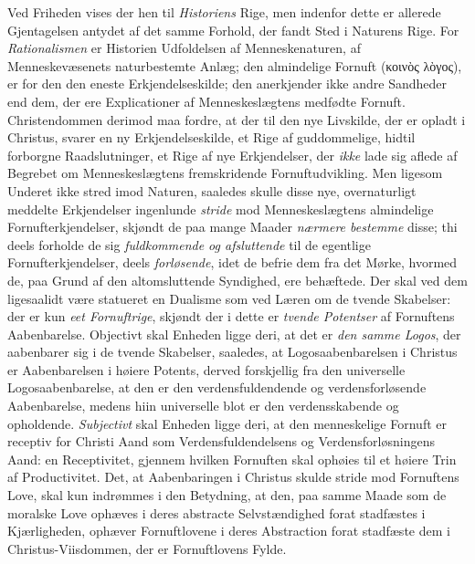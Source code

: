 \documentclass[12pt,a4paper]{book}
\newcommand{\opage}[1]{\marginnote{\footnotesize\textit{[#1]}}}
\begin{document}
Ved Friheden vises der hen til \emph{Historiens} Rige, men indenfor dette er allerede
Gjentagelsen antydet af det samme Forhold, der fandt Sted i Naturens Rige. For \emph{Rationalismen} er Historien Udfoldelsen af Menneskenaturen, af Menneskevæsenets
naturbestemte Anlæg; den almindelige Fornuft (κοινὸς λὸγος), er for den den eneste
Erkjendelseskilde; den anerkjender ikke andre Sandheder end dem, der ere Explicationer af
Menneskeslægtens medfødte Fornuft. Christendommen derimod maa fordre, at der til den nye
Livskilde, der er opladt i Christus, svarer en ny Erkjendelseskilde, et Rige af
guddommelige, hidtil forborgne Raadslutninger, et Rige af nye Erkjendelser, der \emph{ikke} lade sig aflede af Begrebet om Menneskeslægtens fremskridende Fornuftudvikling. Men ligesom
Underet ikke stred imod Naturen, saaledes skulle disse nye, overnaturligt meddelte
Erkjendelser ingenlunde \emph{stride} mod Menneskeslægtens almindelige Fornufterkjendelser,
skjøndt de paa mange Maader \emph{nærmere bestemme} disse; thi deels forholde de sig
\emph{fuldkommende og afsluttende} til de egentlige Fornufterkjendelser, deels
\emph{forløsende}, idet de befrie dem fra det Mørke, hvormed de, paa Grund af den
altomsluttende Syndighed, ere behæftede. Der skal ved dem ligesaalidt være statueret en
Dualisme som ved Læren om de tvende Skabelser: der er kun \emph{eet Fornuftrige}, skjøndt der i dette er \emph{tvende Potentser} af Fornuftens Aabenbarelse. Objectivt skal Enheden ligge
deri, at det er \emph{den samme Logos}, der aabenbarer sig i de tvende Skabelser,
saaledes, at Logosaabenbarelsen i Christus er Aabenbarelsen i høiere Potents, derved
forskjellig fra den universelle Logosaabenbarelse, at den er den verdensfuldendende og
verdensforløsende \opage{91}Aabenbarelse, medens hiin universelle blot er den verdensskabende og
opholdende. \emph{Subjectivt} skal Enheden ligge deri, at den menneskelige Fornuft er receptiv
for Christi Aand som Verdensfuldendelsens og Verdensforløsningens Aand: en Receptivitet,
gjennem hvilken Fornuften skal ophøies til et høiere Trin af Productivitet. Det, at
Aabenbaringen i Christus skulde stride mod Fornuftens Love, skal kun indrømmes i den
Betydning, at den, paa samme Maade som de moralske Love ophæves i deres abstracte
Selvstændighed forat stadfæstes i Kjærligheden, ophæver Fornuftlovene i deres Abstraction
forat stadfæste dem i Christus-Viisdommen, der er Fornuftlovens Fylde.
\end{document}

